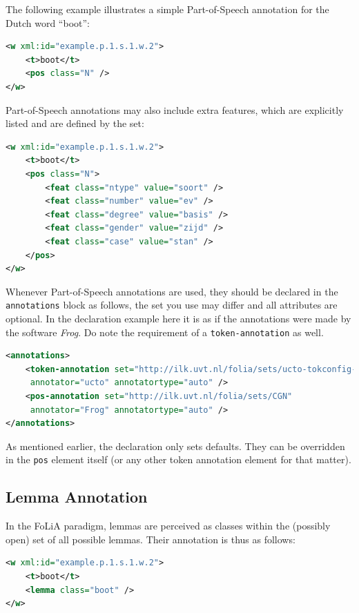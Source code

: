 \documentclass[a4paper,12pt]{report}
\begin{document}
The following example illustrates a simple Part-of-Speech annotation for the Dutch word ``boot'':

\begin{lstlisting}[language=xml]
<w xml:id="example.p.1.s.1.w.2">
    <t>boot</t>
    <pos class="N" />
</w>
\end{lstlisting}

Part-of-Speech annotations may also include extra features, which are explicitly listed and are defined by the set:

\begin{lstlisting}[language=xml]
<w xml:id="example.p.1.s.1.w.2">
    <t>boot</t>
    <pos class="N">
        <feat class="ntype" value="soort" />
        <feat class="number" value="ev" />
        <feat class="degree" value="basis" />
        <feat class="gender" value="zijd" />
        <feat class="case" value="stan" />
    </pos>
</w>
\end{lstlisting}

Whenever Part-of-Speech annotations are used, they should be declared in the \texttt{annotations} block as follows, the set you use may differ and all attributes are optional. In the declaration example here it is as if the annotations were made by the software \emph{Frog}. Do note the requirement of a \texttt{token-annotation} as well.

\begin{lstlisting}[language=xml]
<annotations>
    <token-annotation set="http://ilk.uvt.nl/folia/sets/ucto-tokconfig-nl" 
     annotator="ucto" annotatortype="auto" />
    <pos-annotation set="http://ilk.uvt.nl/folia/sets/CGN" 
     annotator="Frog" annotatortype="auto" />
</annotations>
\end{lstlisting}

As mentioned earlier, the declaration only sets defaults. They can be overridden in the \texttt{pos} element itself (or any other token annotation element for that matter).

\subsection{Lemma Annotation}

In the FoLiA paradigm, lemmas are perceived as classes within the (possibly open) set of all possible lemmas. Their annotation is thus as follows:

\begin{lstlisting}[language=xml]
<w xml:id="example.p.1.s.1.w.2">
    <t>boot</t>
    <lemma class="boot" />
</w>
\end{lstlisting}
\end{document}

